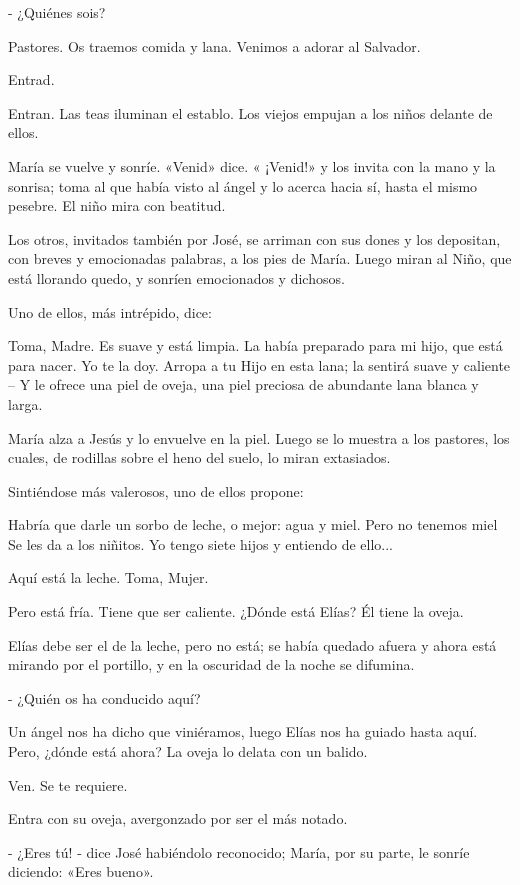 \documentclass[12pt]{book} %
\begin{document}
- ¿Quiénes sois? 

Pastores. Os traemos comida y lana. Venimos a adorar al Salvador. 

Entrad. 

Entran. Las teas iluminan el establo. Los viejos empujan a los niños delante de ellos. 

María se vuelve y sonríe. «Venid» dice. « ¡Venid!» y los invita con la mano y la sonrisa; toma al que había visto al ángel y lo acerca hacia sí, hasta el mismo pesebre. El niño mira con beatitud. 

Los otros, invitados también por José, se arriman con sus dones y los depositan, con breves y emocionadas palabras, a los pies de María. Luego miran al Niño, que está llorando quedo, y sonríen emocionados y dichosos. 

Uno de ellos, más intrépido, dice: 

Toma, Madre. Es suave y está limpia. La había preparado para mi hijo, que está para nacer. Yo te la doy. Arropa a tu Hijo en esta lana; la sentirá suave y caliente – Y le ofrece una piel de oveja, una piel preciosa de abundante lana blanca y larga. 

María alza a Jesús y lo envuelve en la piel. Luego se lo muestra a los pastores, los cuales, de rodillas sobre el heno del suelo, lo miran extasiados. 

Sintiéndose más valerosos, uno de ellos propone: 

Habría que darle un sorbo de leche, o mejor: agua y miel. Pero no tenemos miel Se les da a los niñitos. Yo tengo siete hijos y entiendo de ello... 

Aquí está la leche. Toma, Mujer. 

Pero está fría. Tiene que ser caliente. ¿Dónde está Elías? Él tiene la oveja. 

Elías debe ser el de la leche, pero no está; se había quedado afuera y ahora está mirando por el portillo, y en la oscuridad de la noche se difumina. 

- ¿Quién os ha conducido aquí? 

Un ángel nos ha dicho que viniéramos, luego Elías nos ha guiado hasta aquí. Pero, ¿dónde está ahora? La oveja lo delata con un balido. 

Ven. Se te requiere. 

Entra con su oveja, avergonzado por ser el más notado. 

- ¿Eres tú! - dice José habiéndolo reconocido; María, por su parte, le sonríe diciendo: «Eres bueno». 
\end{document}
